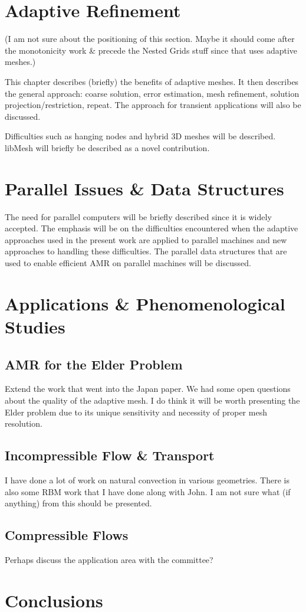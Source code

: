 \documentclass[12pt,pdftex]{article}
\begin{document}
\begin{spacing}{1.5}
\section{Adaptive Refinement}
(I am not sure about the positioning of this section.  Maybe it should
come after the monotonicity work \& precede the Nested Grids stuff
since that uses adaptive meshes.)

This chapter describes (briefly) the benefits of adaptive meshes.  It
then describes the general approach:  coarse solution, error
estimation, mesh refinement, solution projection/restriction, repeat.
The approach for transient applications will also be discussed.

Difficulties such as hanging nodes and hybrid 3D meshes will be
described.  libMesh will briefly be described as a novel contribution.

\section{Parallel Issues \& Data Structures}
The need for parallel computers will be briefly described since it is
widely accepted.  The emphasis will be on the difficulties encountered
when the adaptive approaches used in the present work are applied to
parallel machines and new approaches to handling these difficulties.
The parallel data structures that are used to enable efficient AMR on
parallel machines will be discussed.

\section{Applications \& Phenomenological Studies}

\subsection{AMR for the Elder Problem}
Extend the work that went into the Japan paper. We had some open
questions about the quality of the adaptive mesh.  I do think it will
be worth presenting the Elder problem due to its unique sensitivity
and necessity of proper mesh resolution.

\subsection{Incompressible Flow \& Transport}
I have done a lot of work on natural convection in various
geometries.  There is also some RBM work that I have done along with
John.  I am not sure what (if anything) from this should be presented.

\subsection{Compressible Flows}
Perhaps discuss the application area with the committee?


\section{Conclusions}
  
\end{spacing}
\end{document}

